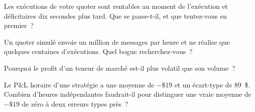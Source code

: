 \begin{interviewq}\label{iq:hf:the-business-of-market-making:3}
Les exécutions de votre quoter sont rentables au moment de l'exécution et déficitaires dix secondes plus tard. Que se passe-t-il, et que tentez-vous en premier~?
\end{interviewq}

\begin{interviewq}\label{iq:hf:the-business-of-market-making:4}
Un quoter simulé envoie un million de messages par heure et ne réalise que quelques centaines d'exécutions. Quel bogue recherchez-vous~?
\end{interviewq}

\begin{interviewq}\label{iq:hf:the-business-of-market-making:5}
Pourquoi le profit d'un teneur de marché est-il plus volatil que son volume~?
\end{interviewq}

\begin{interviewq}\label{iq:hf:the-business-of-market-making:6}
Le P\&L horaire d'une stratégie a une moyenne de $-\$19$ et un écart-type de 89~\$. Combien d'heures indépendantes faudrait-il pour distinguer une vraie moyenne de
$-\$19$ de zéro à deux erreurs types près~?
\end{interviewq}
